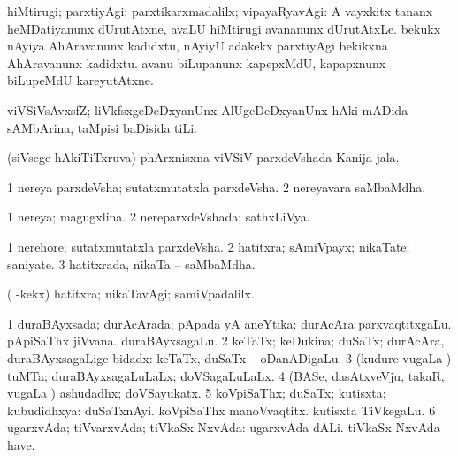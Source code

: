 \bentry
{} 
\gl{\kirxvi}
\expl{\Latin}
\bmng
 hiMtirugi; parxtiyAgi; parxtikarxmadalilx; vipayaRyavAgi:  A vayxkitx tananx heMDatiyanunx dUrutAtxne, avaLU hiMtirugi avananunx dUrutAtxLe.  bekukx nAyiya AhAravanunx kadidxtu, nAyiyU adakekx parxtiyAgi bekikxna AhAravanunx kadidxtu.  avanu biLupanunx kapepxMdU, kapapxnunx biLupeMdU kareyutAtxne. 
\emng
\eentry

\bentry
{} 
\gl{\nA}
\expl{}
\bmng
 viVSiVsAvxsfZ; liVkfsxgeDeDxyanUnx AlUgeDeDxyanUnx hAki mADida sAMbArina, taMpisi baDisida tiLi. 
\emng
\eentry

\bentry
{} 
\gl{\nA}
\expl{}
\bmng
 (siVsege hAkiTiTxruva) phArxnisxna viVSiV parxdeVshada Kanija jala. 
\emng
\eentry

\bentry
{} 
\gl{\nA}
\expl{}
\bmng
\bnum
\num{1} nereya parxdeVsha; sutatxmutatxla parxdeVsha. 
\num{2} nereyavara saMbaMdha. 
\enum
\emng
\eentry

\bentry
{} 
\gl{\gu}
\expl{}
\bmng
\bnum
\num{1} nereya; magugxlina. 
\num{2} nereparxdeVshada; sathxLiVya. 
\enum
\emng
\eentry

\bentry
{} 
\gl{\nA}
\bmng
\bnum
\num{1} nerehore; sutatxmutatxla parxdeVsha. 
\num{2} hatitxra; sAmiVpayx; nikaTate; saniyate. 
\num{3} hatitxrada, nikaTa -- saMbaMdha. 
\enum
\emng

\noindent 
\gl{\pagu}
\expl{}
\bmng
  ( -kekx) hatitxra; nikaTavAgi; samiVpadalilx. 
\emng
\eentry

\bentry 
{} 
\gl{\gu}
\expl{}
\bmng
\bnum
\num{1} duraBAyxsada; durAcArada; pApada yA aneYtika:  durAcAra parxvaqtitxgaLu.  pApiSaThx jiVvana.  duraBAyxsagaLu. 
\num{2} keTaTx; keDukina; duSaTx; durAcAra, duraBAyxsagaLige bidadx:  keTaTx, duSaTx -- oDanADigaLu. 
\num{3} (kudure \mo vugaLa \vi) tuMTa; duraBAyxsagaLuLaLx; doVSagaLuLaLx. 
\num{4} (BASe, dasAtxveVju, takaR, \mo vugaLa \vi) ashudadhx; doVSayukatx. 
\num{5} koVpiSaThx; duSaTx; kutisxta; kubudidhxya:  duSaTxnAyi.  koVpiSaThx manoVvaqtitx.  kutisxta TiVkegaLu. 
\num{6} ugarxvAda; tiVvarxvAda; tiVkaSx NxvAda:  ugarxvAda dALi.  tiVkaSx NxvAda have. 
\enum
\emng
\eentry

